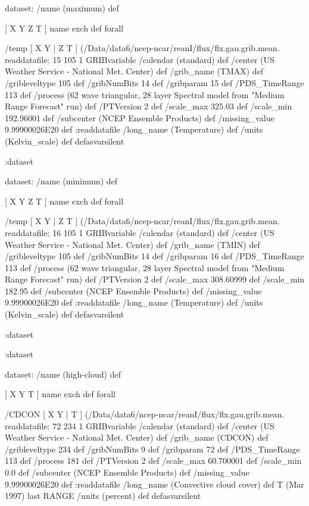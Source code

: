 \begin{ingrid}
  dataset: /name (maximum) def

   [ X Y Z T ] { name exch def } forall

   /temp { [ X Y | Z T ] (/Data/data6/ncep-ncar/reanI/flux/flx.gau.grib.mean.%
   readdatafile:
   15 105 1 GRIBvariable
   /calendar (standard) def
   /center (US Weather Service - National Met. Center) def
   /grib_name (TMAX) def
   /gribleveltype 105 def
   /gribNumBits 14 def
   /gribparam 15 def
   /PDS_TimeRange 113 def
   /process (62 wave triangular, 28 layer Spectral model from "Medium Range Forecast" run) def
   /PTVersion 2 def
   /scale_max 325.03 def
   /scale_min 192.96001 def
   /subcenter (NCEP Ensemble Products) def
   /missing_value 9.99900026E20 def
   :readdatafile
   /long_name (Temperature) def
   /units (Kelvin_scale) def
   } defasvarsilent

  :dataset

  dataset: /name (minimum) def

   [ X Y Z T ] { name exch def } forall

   /temp { [ X Y | Z T ] (/Data/data6/ncep-ncar/reanI/flux/flx.gau.grib.mean.%
   readdatafile:
   16 105 1 GRIBvariable
   /calendar (standard) def
   /center (US Weather Service - National Met. Center) def
   /grib_name (TMIN) def
   /gribleveltype 105 def
   /gribNumBits 14 def
   /gribparam 16 def
   /PDS_TimeRange 113 def
   /process (62 wave triangular, 28 layer Spectral model from "Medium Range Forecast" run) def
   /PTVersion 2 def
   /scale_max 308.60999 def
   /scale_min 182.95 def
   /subcenter (NCEP Ensemble Products) def
   /missing_value 9.99900026E20 def
   :readdatafile
   /long_name (Temperature) def
   /units (Kelvin_scale) def
   } defasvarsilent

  :dataset

 :dataset

 dataset: /name (high-cloud) def

  [ X Y T ] { name exch def } forall

  /CDCON { [ X Y | T ] (/Data/data6/ncep-ncar/reanI/flux/flx.gau.grib.mean.%
  readdatafile:
  72 234 1 GRIBvariable
  /calendar (standard) def
  /center (US Weather Service - National Met. Center) def
  /grib_name (CDCON) def
  /gribleveltype 234 def
  /gribNumBits 9 def
  /gribparam 72 def
  /PDS_TimeRange 113 def
  /process 181 def
  /PTVersion 2 def
  /scale_max 60.700001 def
  /scale_min 0.0 def
  /subcenter (NCEP Ensemble Products) def
  /missing_value 9.99900026E20 def
  :readdatafile
  /long_name (Convective cloud cover) def
  T (Mar 1997) last RANGE
  /units (percent) def
  } defasvarsilent


\end{ingrid}
